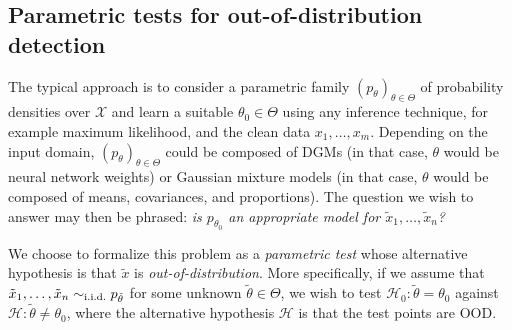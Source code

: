 {\subsection{Parametric tests for out-of-distribution detection}\label{sec_modelagnostic:parametric}
The typical approach is to consider a parametric family $(p_\theta)_{\theta \in  \Theta}$ of probability densities over $\mathcal{X}$ and learn a suitable $\theta_0 \in  \Theta$ using any inference technique, for example maximum likelihood, and the clean data $x_1,\ldots,x_m$. Depending on the input domain, $(p_\theta)_{\theta \in  \Theta}$ could be composed of DGMs (in that case, $\theta$ would be neural network weights) or Gaussian mixture models (in that case, $\theta$ would be composed of means, covariances, and proportions). The question we wish to answer may then be phrased: \emph{is $p_{\theta_0}$ an appropriate model for $\tilde{x}_1,\ldots,\tilde{x}_n$?}
%

We choose to formalize this problem as a \emph{parametric test} whose alternative hypothesis is that $\tilde{x}$ is \emph{out-of-distribution}. More specifically, if we assume that $\tilde{x}_1,\ldots,\tilde{x}_n \sim_{\textup{i.i.d.}} p_{\tilde{\theta}}$ for some unknown $\tilde{\theta} \in \Theta$, we wish to test $\mathcal{H}_0 : \tilde{\theta} = \theta_0$ against $\mathcal{H} : \tilde{\theta} \neq \theta_0$, where the alternative hypothesis $\mathcal{H}$ is that the test points are OOD.

}
